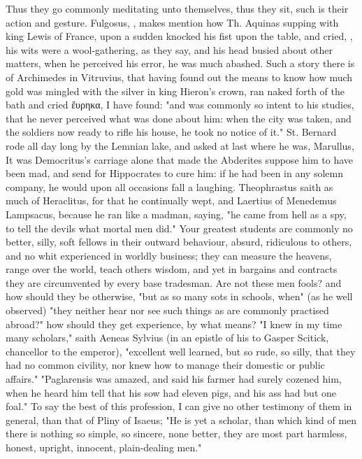 Thus they go commonly meditating unto themselves, thus they sit, such is their
action and gesture. Fulgosus, , makes mention
how Th. Aquinas supping with king Lewis of France, upon a sudden knocked his
fist upon the table, and cried, , his wits
were a wool-gathering, as they say, and his head busied about other matters,
when he perceived his error, he was much abashed. Such a
story there is of Archimedes in Vitruvius, that having found out the means to
know how much gold was mingled with the silver in king Hieron's crown, ran
naked forth of the bath and cried \textgreek{ἕυρηκα}, I have found:
"and was commonly so intent to his studies, that he never
perceived what was done about him: when the city was taken, and the soldiers
now ready to rifle his house, he took no notice of it." St. Bernard rode all
day long by the Lemnian lake, and asked at last where he was, Marullus,
 It was Democritus's carriage alone that
made the Abderites suppose him to have been mad, and send for Hippocrates to
cure him: if he had been in any solemn company, he would upon all occasions
fall a laughing. Theophrastus saith as much of Heraclitus, for that he
continually wept, and Laertius of Menedemus Lampsacus, because he ran like a
madman, saying, "he came from hell as a spy, to tell the
devils what mortal men did." Your greatest students are commonly no better,
silly, soft fellows in their outward behaviour, absurd, ridiculous to others,
and no whit experienced in worldly business; they can measure the heavens,
range over the world, teach others wisdom, and yet in bargains and contracts
they are circumvented by every base tradesman. Are not these men fools? and how
should they be otherwise, "but as so many sots in schools, when" (as
he well observed) "they neither hear nor see such things
as are commonly practised abroad?" how should they get experience, by what
means? "I knew in my time many scholars," saith Aeneas
Sylvius (in an epistle of his to Gasper Scitick, chancellor to the emperor),
"excellent well learned, but so rude, so silly, that they had no common
civility, nor knew how to manage their domestic or public affairs."
"Paglarensis was amazed, and said his farmer had surely cozened him, when he
heard him tell that his sow had eleven pigs, and his ass had but one foal." To
say the best of this profession, I can give no other testimony of them in
general, than that of Pliny of Isaeus; "He is yet a
scholar, than which kind of men there is nothing so simple, so sincere, none
better, they are most part harmless, honest, upright, innocent, plain-dealing
men."

